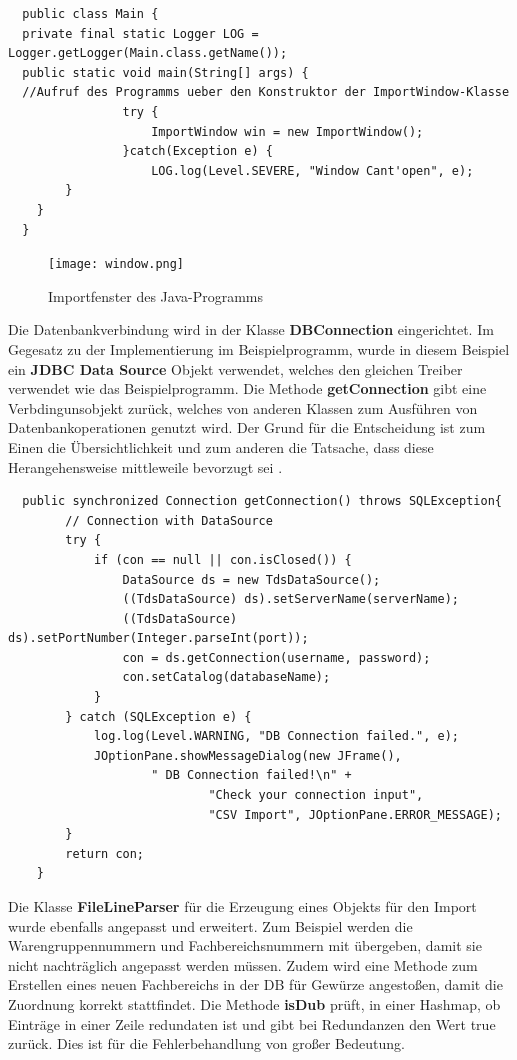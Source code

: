 \begin{lstlisting}
  public class Main {
  private final static Logger LOG = Logger.getLogger(Main.class.getName());
  public static void main(String[] args) {
  //Aufruf des Programms ueber den Konstruktor der ImportWindow-Klasse
				try {
					ImportWindow win = new ImportWindow();
				}catch(Exception e) {
					LOG.log(Level.SEVERE, "Window Cant'open", e);
        }
    }
  }

\end{lstlisting}
\begin{figure}[ht!]
  \texttt{[image: window.png]}
  \caption{Importfenster des Java-Programms}
  \label{import}
\end{figure}
Die Datenbankverbindung wird in der Klasse \textbf{DBConnection} eingerichtet. Im Gegesatz zu der Implementierung im Beispielprogramm, wurde in diesem Beispiel ein \textbf{JDBC Data Source} Objekt verwendet, welches den gleichen Treiber verwendet wie das Beispielprogramm. Die Methode \textbf{getConnection} gibt eine Verbdingunsobjekt zurück, welches von anderen Klassen zum Ausführen von Datenbankoperationen genutzt wird. Der Grund für die Entscheidung ist zum Einen die Übersichtlichkeit und zum anderen die Tatsache, dass diese Herangehensweise mittleweile bevorzugt sei \citep{Wulff2019}.

\begin{lstlisting}
  public synchronized Connection getConnection() throws SQLException{
		// Connection with DataSource
		try {
			if (con == null || con.isClosed()) {
				DataSource ds = new TdsDataSource();
				((TdsDataSource) ds).setServerName(serverName);
				((TdsDataSource) ds).setPortNumber(Integer.parseInt(port));
				con = ds.getConnection(username, password);
				con.setCatalog(databaseName);
			}
		} catch (SQLException e) {
			log.log(Level.WARNING, "DB Connection failed.", e);
			JOptionPane.showMessageDialog(new JFrame(),
					" DB Connection failed!\n" +
							"Check your connection input",
							"CSV Import", JOptionPane.ERROR_MESSAGE);
		}
		return con;
	}
\end{lstlisting}

Die Klasse \textbf{FileLineParser} für die Erzeugung eines Objekts für den Import wurde ebenfalls angepasst und erweitert. Zum Beispiel werden die Warengruppennummern und Fachbereichsnummern mit übergeben, damit sie nicht nachträglich angepasst werden müssen. Zudem wird eine Methode zum Erstellen eines neuen Fachbereichs in der DB für Gewürze angestoßen, damit die Zuordnung korrekt stattfindet. Die Methode \textbf{isDub} prüft, in einer Hashmap, ob Einträge in einer Zeile redundaten ist und gibt bei Redundanzen den Wert true zurück. Dies ist für die Fehlerbehandlung von großer Bedeutung.

